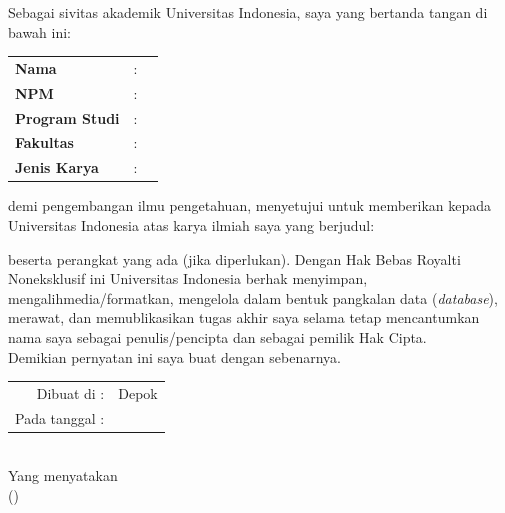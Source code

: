 % 
% 



\vspace*{0.2cm}
\noindent 
Sebagai sivitas akademik Universitas Indonesia, saya yang bertanda 
tangan di bawah ini:
\vspace*{0.4cm}


\begin{tabular}{p{4.2cm} l p{6cm}}
	\textbf{Nama} & : & \penulis \\ 	
	\textbf{NPM} & : & \npm \\
	\textbf{Program Studi} & : & \program\\	
	\textbf{Fakultas} & : & \fakultas\\
	\textbf{Jenis Karya} & : & \type \\
\end{tabular}

\vspace*{0.6cm}
\noindent demi pengembangan ilmu pengetahuan, menyetujui untuk memberikan 
kepada Universitas Indonesia  atas karya ilmiah saya yang berjudul:
\begin{center}
	\judul
\end{center}
beserta perangkat yang ada (jika diperlukan). Dengan Hak Bebas Royalti 
Noneksklusif ini Universitas Indonesia berhak menyimpan, 
mengalihmedia/formatkan, mengelola dalam bentuk pangkalan data 
(\textit{database}), merawat, dan memublikasikan tugas akhir saya selama 
tetap mencantumkan nama saya sebagai penulis/pencipta dan sebagai 
pemilik Hak Cipta. \\

\noindent Demikian pernyatan ini saya buat dengan sebenarnya.

\begin{center}
	\vspace*{0.8cm}
	\begin{tabular}{rl}
		Dibuat di : & Depok \\
		Pada tanggal : & \tanggalPengesahan \\
	\end{tabular}\\

	\vspace*{0.2cm}
	Yang menyatakan \\
	
	\vspace*{1.1cm}
	(\penulis)
\end{center}

\newpage

